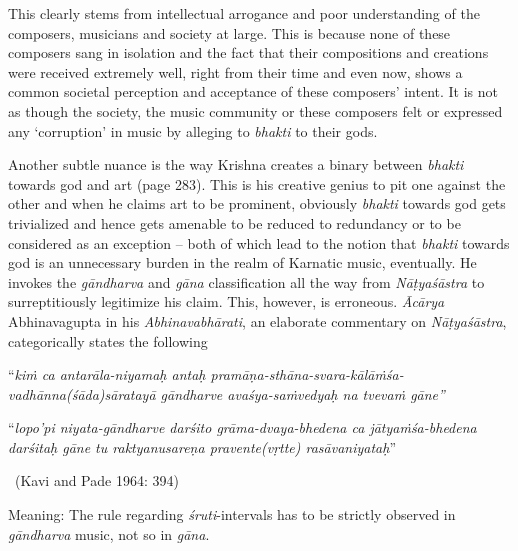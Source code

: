 This clearly stems from intellectual arrogance and poor understanding of the composers, musicians and society at large. This is because none of these composers sang in isolation and the fact that their compositions and creations were received extremely well, right from their time and even now, shows a common societal perception and acceptance of these composers’ intent. It is not as though the society, the music community or these composers felt or expressed any ‘corruption’ in music by alleging to \textit{bhakti} to their gods.

Another subtle nuance is the way Krishna creates a binary between \textit{bhakti} towards god and art (page 283). This is his creative genius to pit one against the other and when he claims art to be prominent, obviously \textit{bhakti} towards god gets trivialized and hence gets amenable to be reduced to redundancy or to be considered as an exception – both of which lead to the notion that \textit{bhakti} towards god is an unnecessary burden in the realm of Karnatic music, eventually. He invokes the \textit{gāndharva} and \textit{gāna} classification all the way from \textit{Nāṭyaśāstra} to surreptitiously legitimize his claim. This, however, is erroneous. \textit{Ācārya} Abhinavagupta in his \textit{Abhinavabhārati}, an elaborate commentary on \textit{Nāṭyaśāstra}, categorically states the following

\begin{myquote}
“\textit{kiṁ ca antarāla-niyamaḥ antaḥ pramāṇa-sthāna-svara-kālāṁśa-vadhānna\break (śāda)sāratayā gāndharve avaśya-saṁvedyaḥ  na tvevaṁ gāne”}
\end{myquote}

\begin{myquote}
“\textit{lopo’pi niyata-gāndharve darśito grāma-dvaya-bhedena ca jātyaṁśa-bhedena darśitaḥ  gāne tu raktyanusareṇa pravente(vṛtte) rasāvaniyataḥ}” 

~\hfill (Kavi and Pade 1964: 394)
\end{myquote}

\begin{myquote}
Meaning: The rule regarding \textit{śruti}-intervals has to be strictly observed in \textit{gāndharva} music, not so in \textit{gāna}.
\end{myquote}


